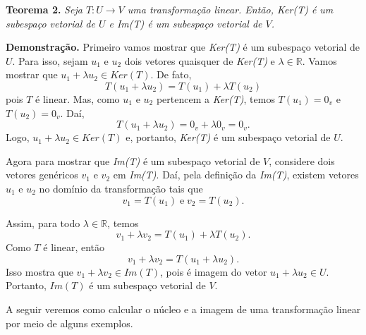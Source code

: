 \vspace{1cm}
\noindent \textbf{Teorema 2.} \textit{Seja $T: U \rightarrow V$ uma transformação linear. Então, \textit{Ker(T)} é um subespaço vetorial de $U$ e \textit{Im(T)} é um subespaço vetorial de $V$.}

\noindent \textbf{Demonstração.} Primeiro vamos mostrar que \textit{Ker(T)} é um subespaço vetorial de $U$. Para isso, sejam $u_1$ e $u_2$ dois vetores quaisquer de  \textit{Ker(T)} e $\lambda \in \mathbb{R}$. Vamos mostrar que $u_1+\lambda u_2 \in{Ker(T)} $. De fato, $$T(u_1+\lambda u_2)=T(u_1)+\lambda T(u_2)$$ pois $T$ é linear. Mas, como $u_1$ e $u_2$ pertencem  a  \textit{Ker(T)},  temos $T(u_1)=0_v$ e $T(u_2)=0_v$. Daí, $$T(u_1+\lambda u_2)=0_v+\lambda 0_v=0_v.$$ Logo,   $u_1+\lambda u_2 \in{Ker(T)} $ e, portanto, \textit{Ker(T)} é um subespaço vetorial de $U$.

Agora para mostrar que \textit{Im(T)} é um subespaço vetorial de $V$, considere dois vetores genéricos  $v_1$ e $v_2$ em \textit{Im(T)}. Daí, pela definição da \textit{Im(T)}, existem vetores $u_1$ e $u_2$ no domínio da transformação tais que
$$v_1=T(u_1) \; \text{e} \; v_2=T(u_2).$$

Assim, para todo $\lambda \in \mathbb{R}$, temos $$v_1+\lambda v_2=T(u_1) +\lambda T(u_2).$$ Como $T$ é linear, então
$$v_1+\lambda v_2=T(u_1 +\lambda u_2).$$ Isso mostra que $v_1+\lambda v_2 \in Im(T)$, pois é imagem do vetor $u_1 +\lambda u_2 \in U$. Portanto, $Im(T)$ é um subespaço vetorial de $V$.

\vspace{1cm}

A seguir veremos como calcular o núcleo e a imagem de uma transformação linear por meio de alguns exemplos.

